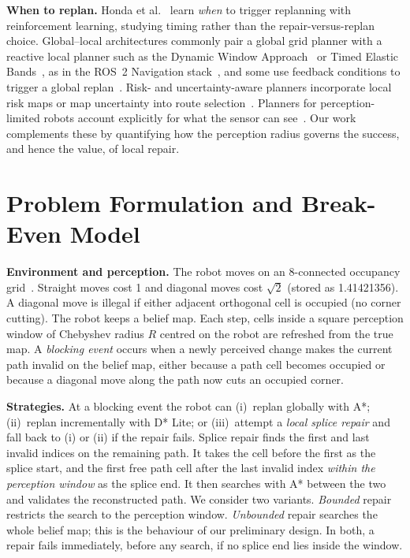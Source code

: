 \documentclass[11pt,a4paper]{article}
\begin{document}
\textbf{When to replan.} Honda et al.~\cite{honda2024when} learn \emph{when} to trigger replanning with reinforcement learning, studying timing rather than the repair-versus-replan choice. Global--local architectures commonly pair a global grid planner with a reactive local planner such as the Dynamic Window Approach~\cite{fox1997dwa} or Timed Elastic Bands~\cite{rosmann2017teb}, as in the ROS~2 Navigation stack~\cite{macenski2020nav2,macenski2023desks}, and some use feedback conditions to trigger a global replan~\cite{pan2026,cui2026}. Risk- and uncertainty-aware planners incorporate local risk maps or map uncertainty into route selection~\cite{stracca2026,allahloh2026}. Planners for perception-limited robots account explicitly for what the sensor can see~\cite{kim2025visibility}. Our work complements these by quantifying how the perception radius governs the success, and hence the value, of local repair.

\section{Problem Formulation and Break-Even Model}\label{sec:model}
\textbf{Environment and perception.} The robot moves on an 8-connected occupancy grid~\cite{elfes1989}. Straight moves cost 1 and diagonal moves cost $\sqrt2$ (stored as 1.41421356). A diagonal move is illegal if either adjacent orthogonal cell is occupied (no corner cutting). The robot keeps a belief map. Each step, cells inside a square perception window of Chebyshev radius $R$ centred on the robot are refreshed from the true map. A \emph{blocking event} occurs when a newly perceived change makes the current path invalid on the belief map, either because a path cell becomes occupied or because a diagonal move along the path now cuts an occupied corner.

\textbf{Strategies.} At a blocking event the robot can (i)~replan globally with A*; (ii)~replan incrementally with D* Lite; or (iii)~attempt a \emph{local splice repair} and fall back to (i) or (ii) if the repair fails. Splice repair finds the first and last invalid indices on the remaining path. It takes the cell before the first as the splice start, and the first free path cell after the last invalid index \emph{within the perception window} as the splice end. It then searches with A* between the two and validates the reconstructed path. We consider two variants. \emph{Bounded} repair restricts the search to the perception window. \emph{Unbounded} repair searches the whole belief map; this is the behaviour of our preliminary design. In both, a repair fails immediately, before any search, if no splice end lies inside the window.
\end{document}
